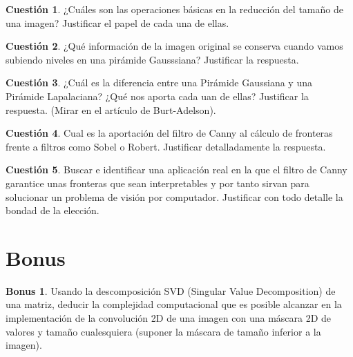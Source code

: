 \documentclass[a4paper, 11pt]{article}
\theoremstyle{definition}
\theoremstyle{theorem}
\newtheorem{cuestion}{Cuestión}
\newtheorem{bonus}{Bonus}
\begin{document}
  \begin{cuestion}
      ¿Cuáles son las operaciones básicas en la reducción del tamaño de una imagen? Justificar el papel de cada una de ellas.
  \end{cuestion}

  \begin{cuestion}
      ¿Qué información de la imagen original se conserva cuando vamos subiendo niveles en una pirámide Gausssiana? Justificar la respuesta.
  \end{cuestion}

  \begin{cuestion}
      ¿Cuál es la diferencia entre una Pirámide Gaussiana y una Pirámide Lapalaciana? ¿Qué nos aporta cada uan de ellas? Justificar la respuesta. (Mirar en el artículo de Burt-Adelson).
  \end{cuestion}

  \begin{cuestion}
      Cual es la aportación del filtro de Canny al cálculo de fronteras frente a filtros como Sobel o Robert. Justificar detalladamente la respuesta.
  \end{cuestion}

  \begin{cuestion}
      Buscar e identificar una aplicación real en la que el filtro de Canny garantice unas fronteras que sean interpretables y por tanto sirvan para solucionar un problema de visión por computador. Justificar con todo detalle la bondad de la elección.
  \end{cuestion}

  \section{Bonus}

  \begin{bonus}
      Usando la descomposición SVD (Singular Value Decomposition) de una matriz, deducir la complejidad computacional que es posible alcanzar en la implementación de la convolución 2D de una imagen con una máscara 2D de valores y tamaño cualesquiera (suponer la máscara de tamaño inferior a la imagen).
  \end{bonus}
\end{document}
